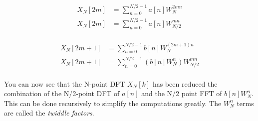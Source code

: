 \documentclass{article}
\begin{document}
\begin{minipage}{0.5\textwidth}
  \begin{align*}
    X_{N}\left[2m\right]   &= \sum_{n=0}^{N/2-1} a\left[n\right] W_{N}^{2mn} \\
    X_{N}\left[2m\right]   &= \sum_{n=0}^{N/2-1} a\left[n\right] W_{N/2}^{mn} \\
  \end{align*}
\end{minipage}
\begin{minipage}{0.5\textwidth}
  \begin{align*}
    X_{N}\left[2m+1\right] &= \sum_{n=0}^{N/2-1} b\left[n\right] W_{N}^{\left(2m+1\right)n} \\
    X_{N}\left[2m+1\right] &= \sum_{n=0}^{N/2-1} \left(b\left[n\right] W_{N}^{n} \right) W_{N/2}^{mn} \\
  \end{align*}
\end{minipage}

You can now see that the N-point DFT $X_{N}\left[k\right]$ has been reduced the combination of the N/2-point DFT of $a\left[n\right]$ and
the N/2 point FFT of $b\left[n\right]W_{N}^{n}$. This can be done recursively to simplify the computations greatly.
The $W_{N}^{n}$ terms are called the \emph{twiddle factors}.
\end{document}
